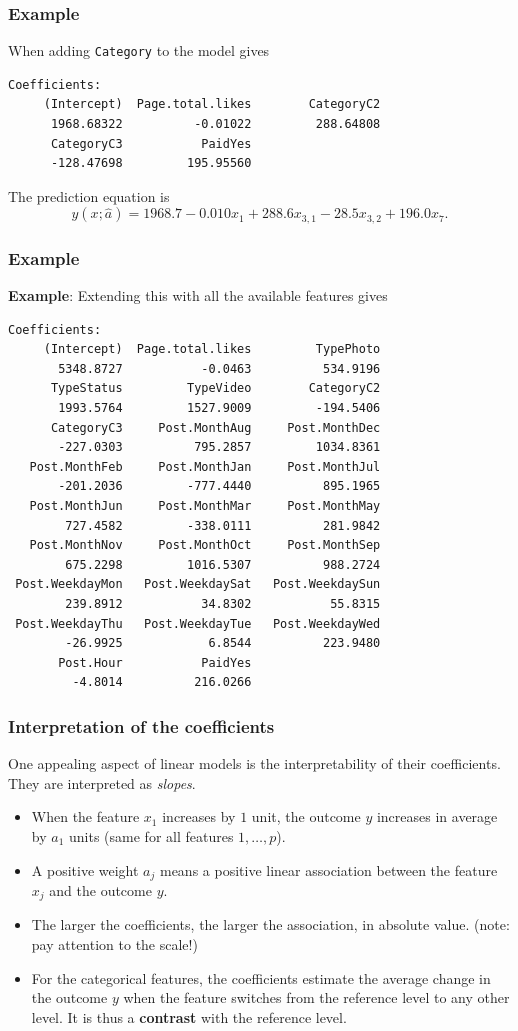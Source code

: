 \begin{frame}[fragile]
\frametitle{Example}
When adding {\tt Category} to the model gives\\ 
\scriptsize
\begin{verbatim}
Coefficients:
     (Intercept)  Page.total.likes        CategoryC2  
      1968.68322          -0.01022         288.64808  
      CategoryC3           PaidYes  
      -128.47698         195.95560
\end{verbatim}
\normalsize
The prediction equation is
$$
y(x;\hat{a}) = 1968.7 - 0.010 x_1 + 288.6 x_{3,1} - 28.5 x_{3,2}+ 196.0 x_7.
$$
\end{frame}
\begin{frame}[fragile]
\frametitle{Example}
{\bf Example}: Extending this with all the available features gives\\ 
\tiny
\begin{verbatim}
Coefficients:
     (Intercept)  Page.total.likes         TypePhoto  
       5348.8727           -0.0463          534.9196  
      TypeStatus         TypeVideo        CategoryC2  
       1993.5764         1527.9009         -194.5406  
      CategoryC3     Post.MonthAug     Post.MonthDec  
       -227.0303          795.2857         1034.8361  
   Post.MonthFeb     Post.MonthJan     Post.MonthJul  
       -201.2036         -777.4440          895.1965  
   Post.MonthJun     Post.MonthMar     Post.MonthMay  
        727.4582         -338.0111          281.9842  
   Post.MonthNov     Post.MonthOct     Post.MonthSep  
        675.2298         1016.5307          988.2724  
 Post.WeekdayMon   Post.WeekdaySat   Post.WeekdaySun  
        239.8912           34.8302           55.8315  
 Post.WeekdayThu   Post.WeekdayTue   Post.WeekdayWed  
        -26.9925            6.8544          223.9480  
       Post.Hour           PaidYes  
         -4.8014          216.0266 
\end{verbatim}
\normalsize
\end{frame}
\begin{frame}
\frametitle{Interpretation of the coefficients}
One appealing aspect of linear models is the interpretability of their coefficients. They are interpreted as {\it slopes}.
\begin{itemize}
\item When the feature $x_1$ increases by $1$ unit, the outcome $y$ increases in average by $a_1$ units (same for all features $1,\ldots,p$).
\item A positive weight $a_j$ means a positive linear association between the feature $x_j$ and the outcome $y$.
\item The larger the coefficients, the larger the association, in absolute value. (note: pay attention to the scale!)
\item For the categorical features, the coefficients estimate the average change in the outcome $y$ when the feature switches from the reference level to any other level. It is thus a {\bf contrast} with the reference level.  
\end{itemize}
\end{frame}
